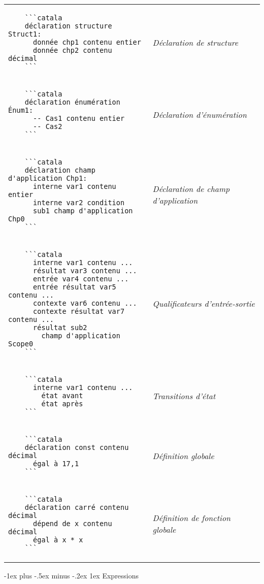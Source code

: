 \documentclass{article}
\makeatletter
\newcommand\articlenormalsize{\fontsize{10pt}{12pt}\selectfont}
\renewcommand{\section}{\@startsection{section}{1}{0mm}%
                                {-1ex plus -.5ex minus -.2ex}%
                                {1ex}%
                                {\normalfont\articlenormalsize\bfseries}}
\newenvironment{catala}{%
  \VerbatimEnvironment
  \let\FV@ListVSpace\relax
  \begin{verbatim}}%
 {\end{verbatim}}
\makeatother
\begin{document}
\begin{multicols}{3}
\begin{tabular}{@{}p{\cola}>{\slshape}p{\colb}@{}}
  
  \begin{catala}
    ```catala
    déclaration structure Struct1:
      donnée chp1 contenu entier
      donnée chp2 contenu décimal
    ```
  \end{catala}
  & Déclaration de structure
  \\
  \begin{catala}
    ```catala
    déclaration énumération Énum1:
      -- Cas1 contenu entier
      -- Cas2
    ```
  \end{catala}
  & Déclaration d'énumération
  \\
  \begin{catala}
    ```catala
    déclaration champ d'application Chp1:
      interne var1 contenu entier
      interne var2 condition
      sub1 champ d'application Chp0
    ```
  \end{catala}
  & Déclaration de champ d'application
  \\
  \begin{catala}
    ```catala
      interne var1 contenu ...
      résultat var3 contenu ...
      entrée var4 contenu ...
      entrée résultat var5 contenu ...
      contexte var6 contenu ...
      contexte résultat var7 contenu ...
      résultat sub2
        champ d'application Scope0
    ```
  \end{catala}
  & Qualificateurs d'entrée-sortie
  \\
  \begin{catala}
    ```catala
      interne var1 contenu ...
        état avant
        état après
    ```
  \end{catala}
  & Transitions d'état
  \\
  \begin{catala}
    ```catala
    déclaration const contenu décimal
      égal à 17,1
    ```
  \end{catala}
  & Définition globale
  \\
  \begin{catala}
    ```catala
    déclaration carré contenu décimal
      dépend de x contenu décimal
      égal à x * x
    ```
  \end{catala}
  & Définition de fonction globale
  \\
\end{tabular}

\section{Expressions}


\end{multicols}
\end{document}
